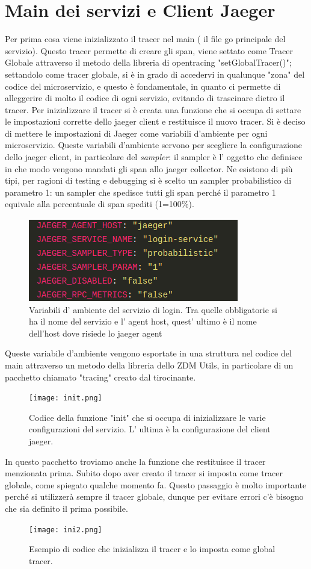 \documentclass[a4paper,12pt,titlepage,italian,openany]{report}
\begin{document}
\section{Main dei servizi e Client Jaeger}
Per prima cosa viene inizializzato il tracer nel main ( il file go principale del servizio). Questo tracer permette di creare gli span, viene settato come Tracer Globale attraverso il metodo della libreria di opentracing "setGlobalTracer()"; settandolo come tracer globale, si è in grado di accedervi in qualunque "zona" del codice del microservizio, e questo è fondamentale, in quanto ci permette di alleggerire
di molto il codice di ogni servizio, evitando di trascinare dietro il tracer. Per inizializzare il tracer si è creata una funzione che si occupa di settare le impostazioni corrette dello jaeger client e restituisce il nuovo tracer. Si è deciso di mettere le impostazioni
di Jaeger come variabili d'ambiente per ogni microservizio. Queste variabili d'ambiente servono per scegliere la configurazione dello jaeger client, in particolare del \textit{sampler}: il sampler è l' oggetto che definisce in che modo vengono mandati gli span allo jaeger collector. Ne esistono di più tipi, per ragioni di testing e debugging si è scelto un sampler probabilistico
 di parametro 1: un sampler che spedisce tutti gli span perché il parametro 1 equivale alla percentuale di span spediti (1=100\%). 
\begin{figure}[H]
    \includegraphics[scale=0.5]{envvar.png}
    \centering
    \caption{Variabili d' ambiente del servizio di login. Tra quelle obbligatorie si ha il nome del servizio e l' agent host, quest' ultimo è il nome dell'host dove risiede lo jaeger agent}
\end{figure}

Queste variabile d'ambiente vengono esportate in una struttura nel codice del main attraverso un metodo della libreria dello ZDM\cite{zdm:1} Utils, in particolare di un pacchetto chiamato "tracing" creato dal tirocinante.
\begin{figure}[H]
    \texttt{[image: init.png]}
    \centering
    \caption{Codice della funzione "init" che si occupa di inizializzare le varie configurazioni del servizio. L' ultima è la configurazione del client jaeger.}
\end{figure}
In questo pacchetto troviamo anche la funzione che restituisce il tracer menzionata prima.
Subito dopo aver creato il tracer si imposta come tracer globale, come spiegato qualche momento fa. Questo passaggio è molto importante perché si utilizzerà sempre il tracer globale,
dunque per evitare errori c'è bisogno che sia definito il prima possibile.
\begin{figure}[H]
    \centering
    \texttt{[image: ini2.png]}
    \caption{Esempio di codice che inizializza il tracer e lo imposta come global tracer.}
\end{figure}
\end{document}
